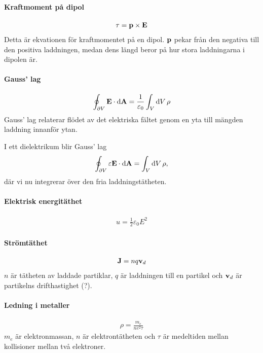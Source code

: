 \paragraph{Kraftmoment på dipol}
\begin{align*}
	\vect{\tau} = \vect{p}\times\vect{E}
\end{align*}
Detta är ekvationen för kraftmomentet på en dipol. $\vect{p}$ pekar från den negativa till den positiva laddningen, medan dens längd beror på hur stora laddningarna i dipolen är.

\deriv

\paragraph{Gauss' lag}
\begin{align*}
	\oint_{\partial V}\vect{E}\cdot\dd{\vect{A}} = \frac{1}{\varepsilon_0}\int_{V}\dd{V}\rho
\end{align*}
Gauss' lag relaterar flödet av det elektriska fältet genom en yta till mängden laddning innanför ytan.

I ett dielektrikum blir Gauss' lag
\begin{align*}
	\oint_{\partial V}\varepsilon\vect{E}\cdot\dd{\vect{A}} = \int_{V}\dd{V}\rho,
\end{align*}
där vi nu integrerar över den fria laddningstätheten.

\deriv

\paragraph{Elektrisk energitäthet}
\begin{align*}
	u = \frac{1}{2}\varepsilon_0E^2
\end{align*}

\deriv

\paragraph{Strömtäthet}
\begin{align*}
	\vect{J} = nq\vect{v}_d
\end{align*}
$n$ är tätheten av laddade partiklar, $q$ är laddningen till en partikel och $\vect{v}_d$ är partikelns drifthastighet (?).

\deriv

\paragraph{Ledning i metaller}
\begin{align*}
	\rho = \frac{m_e}{ne^2\tau}
\end{align*}
$m_e$ är elektronmassan, $n$ är elektrontätheten och $\tau$ är medeltiden mellan kollisioner mellan två elektroner.


